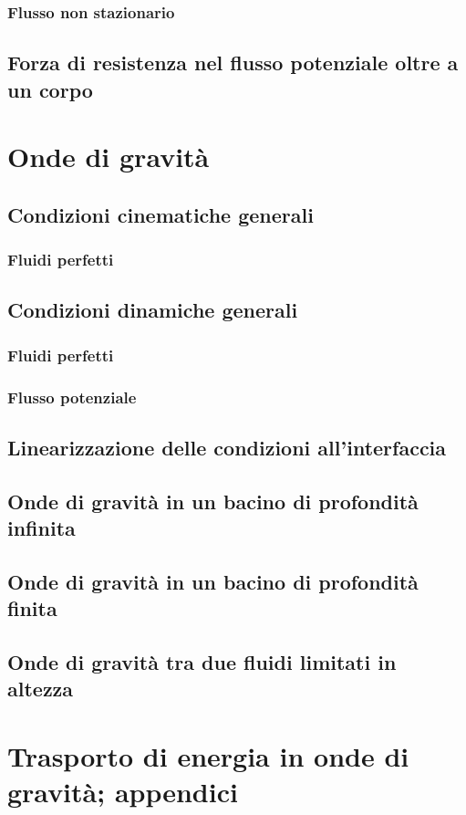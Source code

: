 \documentclass[a4paper,11pt]{report}
\begin{document}
 		\subsection{Flusso non stazionario}		
	\section{Forza di resistenza nel flusso potenziale oltre a un corpo}		


\chapter{Onde di gravità}
	\section{Condizioni cinematiche generali}
		\subsection{Fluidi perfetti}
	\section{Condizioni dinamiche generali}
		\subsection{Fluidi perfetti}
		\subsection{Flusso potenziale}
	\section{Linearizzazione delle condizioni all'interfaccia}
	\section{Onde di gravità in un bacino di profondità infinita}
	\section{Onde di gravità in un bacino di profondità finita}
	\section{Onde di gravità tra due fluidi limitati in altezza}


\chapter{Trasporto di energia in onde di gravità; appendici}
\end{document}
